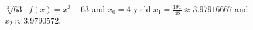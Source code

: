{$\sqrt[3]{63}$.}
{$f(x)=x^3-63$ and $x_0=4$ yield $x_1=\frac{191}{48}\approx3.97916667$ and $x_2\approx3.9790572$.}

